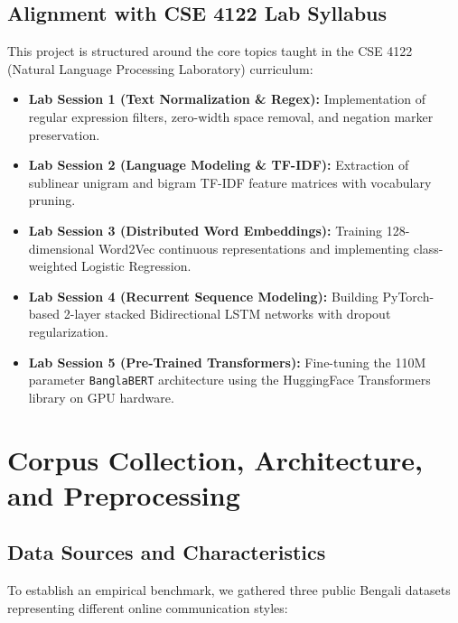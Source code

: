 \documentclass[11pt,a4paper]{article}
\begin{document}
\subsection{Alignment with CSE 4122 Lab Syllabus}
This project is structured around the core topics taught in the CSE 4122 (Natural Language Processing Laboratory) curriculum:
\begin{itemize}[leftmargin=*]
    \item \textbf{Lab Session 1 (Text Normalization \& Regex):} Implementation of regular expression filters, zero-width space removal, and negation marker preservation.
    \item \textbf{Lab Session 2 (Language Modeling \& TF-IDF):} Extraction of sublinear unigram and bigram TF-IDF feature matrices with vocabulary pruning.
    \item \textbf{Lab Session 3 (Distributed Word Embeddings):} Training 128-dimensional Word2Vec continuous representations and implementing class-weighted Logistic Regression.
    \item \textbf{Lab Session 4 (Recurrent Sequence Modeling):} Building PyTorch-based 2-layer stacked Bidirectional LSTM networks with dropout regularization.
    \item \textbf{Lab Session 5 (Pre-Trained Transformers):} Fine-tuning the 110M parameter \texttt{BanglaBERT} architecture using the HuggingFace Transformers library on GPU hardware.
\end{itemize}

\section{Corpus Collection, Architecture, and Preprocessing}
\subsection{Data Sources and Characteristics}
To establish an empirical benchmark, we gathered three public Bengali datasets representing different online communication styles:
\end{document}
